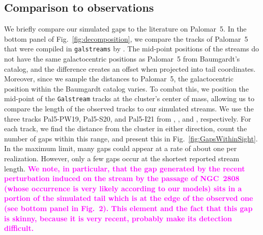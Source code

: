 \documentclass{aa}
\newcommand{\paola}[1]{\textcolor{magenta}{{#1}}}
\begin{document}
  \subsection{Comparison to observations}

    We briefly compare our simulated gaps to the literature on Palomar~5. In the bottom panel of Fig.~\ref{fig:decomposition}, we compare the tracks of Palomar~5 that were compiled in \texttt{galstreams} by \citet{2023MNRAS.520.5225M}. The mid-point positions of the streams do not have the same galactocentric positions as Palomar~5 from Baumgardt's catalog, and the difference creates an offset when projected into tail coordinates. Moreover, since we sample the distances to Palomar~5, the galactocentric position within the Baumgardt catalog varies. To combat this, we position the mid-point of the \texttt{Galstream} tracks at the cluster's center of mass, allowing us to compare the length of the observed tracks to our simulated streams. We use the three tracks Pal5-PW19, Pal5-S20, and Pal5-I21 from \citet{2019AJ....158..223P}, \citet{2020MNRAS.495.2222S}, and \citet{2021ApJ...914..123I}, respectively. For each track, we find the distance from the cluster in either direction, count the number of gaps within this range, and present this in Fig.~\ref{fig:GapsWithinSight}. In the maximum limit, many gaps could appear at a rate of about one per realization. However, only a few gaps occur at the shortest reported stream length. \textbf{\paola{We note, in particular, that the gap generated by the recent perturbation induced on the stream by the passage of NGC~2808 (whose occurrence is very likely according to our models) sits in a portion of the simulated tail which is at the edge of the observed one (see bottom panel in Fig.~2). This element and the fact that this gap is skinny, because it is very recent, probably make its detection difficult. }}
\end{document}
